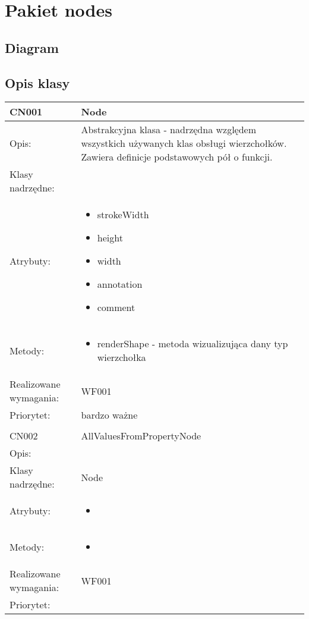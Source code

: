 \documentclass[a4paper,10pt]{article}
\begin{document}
\section{Pakiet nodes}

\subsection{Diagram}

\subsection{Opis klasy}

\begin{center}
 


\begin{tabular}{|m{3cm}|m{9cm}|} \hline

CN001 & Node \\ \hline
Opis: & Abstrakcyjna klasa - nadrzędna względem wszystkich używanych klas obsługi wierzchołków. Zawiera definicje podstawowych pół o funkcji.    \\ \hline
Klasy nadrzędne: &     \\ \hline
Atrybuty: & \begin{itemize}
 \item strokeWidth
 \item height
 \item width
 \item annotation
 \item comment 
\end{itemize}
 \\ \hline
Metody: & \begin{itemize}
 \item renderShape - metoda wizualizująca dany typ wierzchołka
\end{itemize}
  \\ \hline
Realizowane wymagania: & WF001 \\ \hline
Priorytet: & bardzo ważne  \\ \hline

\multicolumn{2}{c}{} \\
 \hline

CN002 & AllValuesFromPropertyNode \\ \hline
Opis: &     \\ \hline
Klasy nadrzędne: & Node     \\ \hline
Atrybuty: & \begin{itemize}
 \item 
\end{itemize}
 \\ \hline
Metody: & \begin{itemize}
 \item 
\end{itemize}
  \\ \hline
Realizowane wymagania: & WF001 \\ \hline
Priorytet: &  \\ \hline


\end{tabular}
\end{center}
\end{document}
